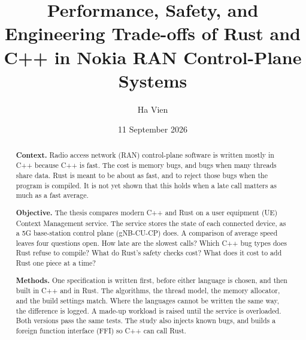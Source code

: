 \documentclass[english,oneside,a4paper,censored,csm,software-track-2020]{HYthesisML}
\title{Performance, Safety, and Engineering Trade-offs of Rust and C++ in Nokia RAN Control-Plane Systems}
\author{Ha Vien}
\date{11 September 2026}
\begin{document}
\maketitle

{\singlespacing
\begin{otherlanguage}{english}
\begin{abstract}
      \setlength{\parskip}{1ex}
      \noindent\textbf{Context.}
      Radio access network (RAN) control-plane software is written mostly in C++ because C++ is fast.
      The cost is memory bugs, and bugs when many threads share data.
      Rust is meant to be about as fast, and to reject those bugs when the program is compiled.
      It is not yet shown that this holds when a late call matters as much as a fast average.
      
      \noindent\textbf{Objective.}
      The thesis compares modern C++ and Rust on a user equipment (UE) Context Management service.
      The service stores the state of each connected device, as a 5G base-station control plane (gNB-CU-CP) does.
      A comparison of average speed leaves four questions open.
      How late are the slowest calls?
      Which C++ bug types does Rust refuse to compile?
      What do Rust's safety checks cost?
      What does it cost to add Rust one piece at a time?
      
      \noindent\textbf{Methods.}
      One specification is written first, before either language is chosen, and then built in C++ and in Rust.
      The algorithms, the thread model, the memory allocator, and the build settings match.
      Where the languages cannot be written the same way, the difference is logged.
      A made-up workload is raised until the service is overloaded.
      Both versions pass the same tests.
      The study also injects known bugs, and builds a foreign function interface (FFI) so C++ can call Rust.
      

\end{abstract}
\end{otherlanguage}}
\end{document}
